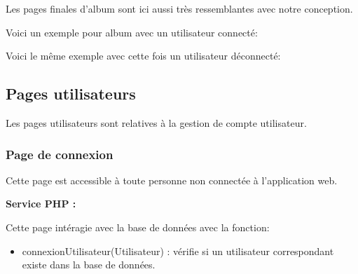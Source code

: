             \begin{paragraphe}
			    Les pages finales d'album sont ici aussi très ressemblantes avec notre conception.
            \end{paragraphe}

            \begin{paragraphe}
                Voici un exemple pour album avec un utilisateur connecté:
            \end{paragraphe}

          \newpage

           \begin{paragraphe}
                Voici le même exemple avec cette fois un utilisateur déconnecté:
            \end{paragraphe}

	\clearpage

	\subsection{Pages utilisateurs}
      \begin{paragraphe}
            Les pages utilisateurs sont relatives à la gestion de compte utilisateur.
        \end{paragraphe}

		\subsubsection{Page de connexion}

			\begin{paragraphe}
				Cette page est accessible à toute personne non connectée à l'application web.
			\end{paragraphe}

			\begin{paragraphe}
				\textbf{Service PHP :}
			\end{paragraphe}

			\begin{paragraphe}
			    Cette page intéragie avec la base de données avec la fonction:
				\begin{itemize}
					\item connexionUtilisateur(Utilisateur) : vérifie si un utilisateur correspondant existe dans la base de données.
				\end{itemize}
			\end{paragraphe}

